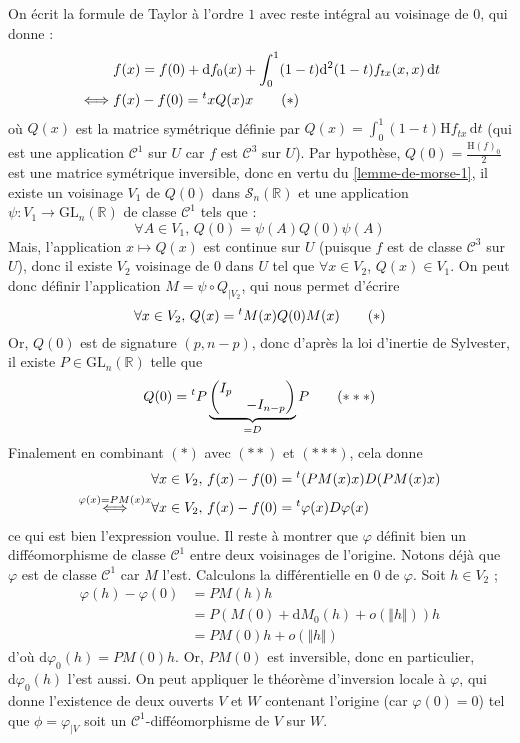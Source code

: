 	\begin{demonstration}
		On écrit la formule de Taylor à l'ordre $1$ avec reste intégral au voisinage de $0$, qui donne :
		\begin{align*}
			&f(x) = f(0) + \mathrm{d} f_0(x) + \int_0^1 (1-t) \mathrm{d}^2 (1-t) f_{tx} (x, x) \, \mathrm{d}t \\
			\iff& f(x) - f(0) = \mathstrut ^t x Q(x) x \tag{$*$}
		\end{align*}
		où $Q(x)$ est la matrice symétrique définie par $Q(x) = \int_0^1 (1-t) \mathrm{H} f_{tx} \, \mathrm{d}t$ (qui est une application $\mathcal{C}^1$ sur $U$ car $f$ est $\mathcal{C}^3$ sur $U$).
		\newpar
		Par hypothèse, $Q(0) = \frac{\mathrm{H} (f)_0}{2}$ est une matrice symétrique inversible, donc en vertu du \cref{lemme-de-morse-1}, il existe un voisinage $V_1$ de $Q(0)$ dans $\mathcal{S}_n(\mathbb{R})$ et une application $\psi : V_1 \rightarrow \mathrm{GL}_n(\mathbb{R})$ de classe $\mathcal{C}^1$ tels que :
		\[ \forall A \in V_1, \, Q(0) = \psi(A) Q(0) \psi(A) \]
		Mais, l'application $x \mapsto Q(x)$ est continue sur $U$ (puisque $f$ est de classe $\mathcal{C}^3$ sur $U$), donc il existe $V_2$ voisinage de $0$ dans $U$ tel que $\forall x \in V_2$, $Q(x) \in V_1$. On peut donc définir l'application $M = \psi \circ Q_{|V_2}$, qui nous permet d'écrire
		\[ \forall x \in V_2, \, Q(x) = \mathstrut ^t M (x) Q(0) M (x) \tag{$*$} \]
		Or, $Q(0)$ est de signature $(p, n-p)$, donc d'après la loi d'inertie de Sylvester, il existe $P \in \mathrm{GL}_n(\mathbb{R})$ telle que
		\[ Q(0) = \mathstrut ^t P \underbrace{\begin{pmatrix} I_p & \\ & - I_{n-p} \end{pmatrix}}_{= D} P \tag{$***$} \]
		Finalement en combinant $(*)$ avec $(**)$ et $(***)$, cela donne
		\begin{align*}
			&\forall x \in V_2, \, f(x) - f(0) = \mathstrut ^t (P M(x) x) D (P M(x) x) \\
			\overset{\varphi(x) = P M(x) x}{\iff}& \forall x \in V_2, \, f(x) - f(0) = \mathstrut ^t \varphi(x) D \varphi(x)
		\end{align*}
		ce qui est bien l'expression voulue.
		\newpar
		Il reste à montrer que $\varphi$ définit bien un difféomorphisme de classe $\mathcal{C}^1$ entre deux voisinages de l'origine. Notons déjà que $\varphi$ est de classe $\mathcal{C}^1$ car $M$ l'est. Calculons la différentielle en $0$ de $\varphi$. Soit $h \in V_2$ ;
		\begin{align*}
			\varphi(h) - \varphi(0) &= P M(h) h \\
			&= P( M(0) + \mathrm{d} M_0 (h) + o(\Vert h \Vert))h \\
			&= P M(0) h + o(\Vert h \Vert)
		\end{align*}
		d'où $\mathrm{d} \varphi_0 (h) = P M(0) h$. Or, $P M(0)$ est inversible, donc en particulier, $\mathrm{d} \varphi_0 (h)$ l'est aussi. On peut appliquer le théorème d'inversion locale à $\varphi$, qui donne l'existence de deux ouverts $V$ et $W$ contenant l'origine (car $\varphi(0) = 0$) tel que $\phi = \varphi_{|V}$ soit un $\mathcal{C}^1$-difféomorphisme de $V$ sur $W$.
	\end{demonstration}

